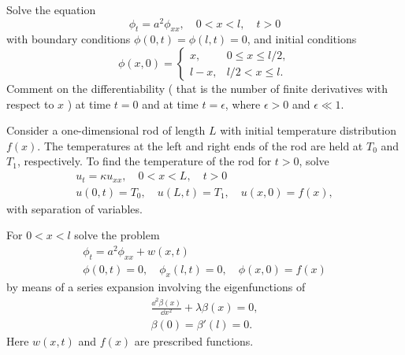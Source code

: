 {\begin{Exercise}
\end{Exercise}




\begin{Exercise}
  \label{exercise diffusion equation zero bc}
  Solve the equation
  \[
  \phi_t = a^2 \phi_{x x}, \quad 0 < x < l, \quad t > 0
  \]
  with boundary conditions $\phi(0, t) = \phi(l, t) = 0$, and initial conditions
  \[
  \phi(x, 0) = \begin{cases}
    x, &0 \leq x \leq l/2, \\
    l-x, & l/2 < x \leq l.
  \end{cases}
  \]
  Comment on the differentiability ( that is the number of finite derivatives
  with respect to $x$ ) at time $t = 0$ and at time $t = \epsilon$, 
  where $\epsilon > 0$ and $\epsilon \ll 1$.

\end{Exercise}





\begin{Exercise}
  \label{exercise diffusion nonzero bc}
  Consider a one-dimensional rod of length $L$ with initial temperature 
  distribution $f(x)$.  The temperatures at the left and right ends of the rod
  are held at $T_0$ and $T_1$, respectively.  To find the temperature of the
  rod for $t>0$, solve
  \begin{gather*}
    u_t = \kappa u_{x x}, \quad 0 < x < L, \quad t > 0 \\
    u(0,t) = T_0, \quad u(L,t) = T_1, \quad u(x,0) = f(x),
  \end{gather*}
  with separation of variables.

\end{Exercise}



\begin{Exercise}
  \label{exercise pt=a2pxx+w p=0 px=0}
  \label{phi_t=a^2phi_xx+w(x,t),phi(0,t)=0,quadphi_x(l,t)=0}
  For $ 0 < x < l$ solve the problem
  \begin{gather}
    \label{phi_t=a2phi_xx+w}
    \phi_t = a^2 \phi_{xx} + w(x,t) \\
    \nonumber
    \phi(0,t) = 0,\quad \phi_x(l,t) = 0,\quad \phi(x,0) = f(x)
  \end{gather}
  by means of a series expansion involving the eigenfunctions of
  \begin{gather*}
    \frac{\dd^2 \beta(x)}{\dd x^2} + \lambda \beta(x) = 0, \\
    \beta(0) = \beta'(l) = 0.
  \end{gather*}
  Here $w(x,t)$ and $f(x)$ are prescribed functions.


\end{Exercise}}
